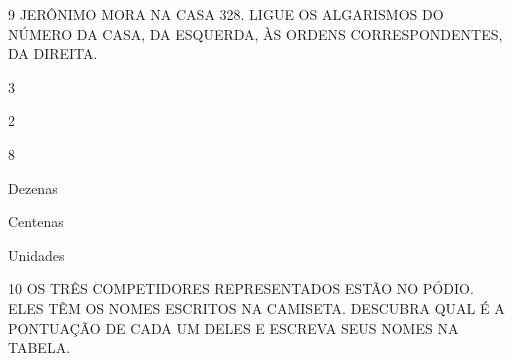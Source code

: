 \num{9} JERÔNIMO MORA NA CASA 328. LIGUE OS ALGARISMOS DO NÚMERO DA CASA, DA ESQUERDA, ÀS ORDENS CORRESPONDENTES, DA DIREITA.

\begin{multicols}{2}
3

2

8

\columnbreak

Dezenas

Centenas

Unidades
\end{multicols}





\num{10} OS TRÊS COMPETIDORES REPRESENTADOS ESTÃO NO PÓDIO. ELES TÊM OS NOMES ESCRITOS NA CAMISETA. DESCUBRA QUAL É A PONTUAÇÃO DE CADA UM DELES E ESCREVA SEUS NOMES NA TABELA.


